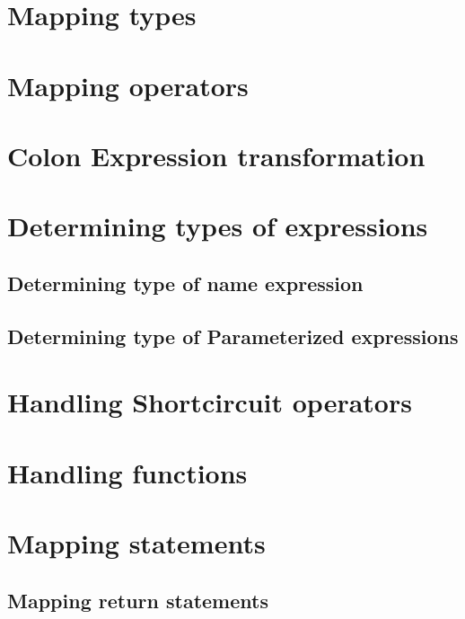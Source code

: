 \section{Mapping types}
\section{Mapping operators}
\section{Colon Expression transformation}
\section{Determining types of expressions}
\subsection{Determining type of name expression}
\subsection{Determining type of Parameterized expressions}
\section{Handling Shortcircuit operators}
\section{Handling functions}
\section{Mapping statements}
\subsection{Mapping return statements}

